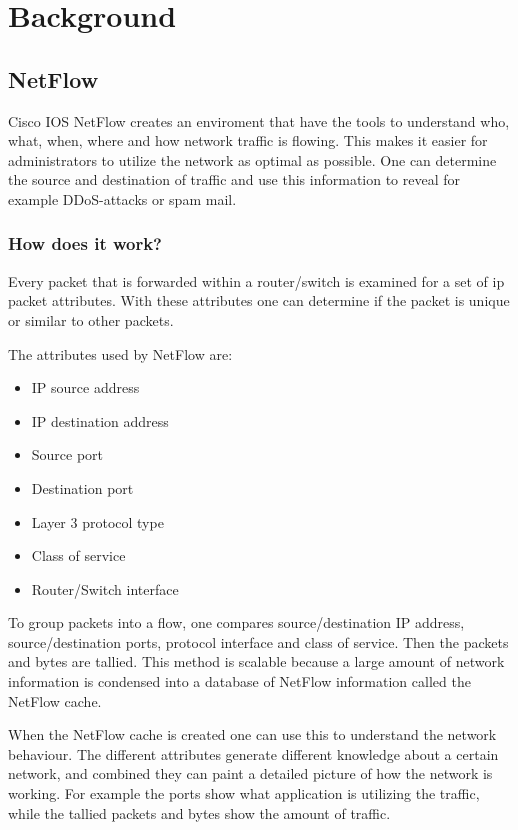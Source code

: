 \chapter{Background}
\label{chp:background} 

\section{NetFlow}
\label{netflow}
Cisco IOS NetFlow creates an enviroment that have the tools to understand who, what, when, where and how network traffic is flowing. This makes it easier for administrators to utilize the network as optimal as possible. One can determine the source and destination of traffic and use this information to reveal for example DDoS-attacks or spam mail.

\subsection{How does it work?}
Every packet that is forwarded within a router/switch is examined for a set of \gls{ip} packet attributes. With these attributes one can determine if the packet is unique or similar to other packets. 

The attributes used by NetFlow are:
\begin{itemize}
\item IP source address
\item IP destination address
\item Source port
\item Destination port
\item Layer 3 protocol type
\item Class of service
\item Router/Switch interface
\end{itemize}

To group packets into a flow, one compares source/destination IP address, source/destination ports, protocol interface and class of service. Then the packets and bytes are tallied. This method is scalable because a large amount of network information is condensed into a database of NetFlow information called the NetFlow cache. 

When the NetFlow cache is created one can use this to understand the network behaviour. The different attributes generate different knowledge about a certain network, and combined they can paint a detailed picture of how the network is working. For example the ports show what application is utilizing the traffic, while the tallied packets and bytes show the amount of traffic. 
\citep{cisco_netflow}

